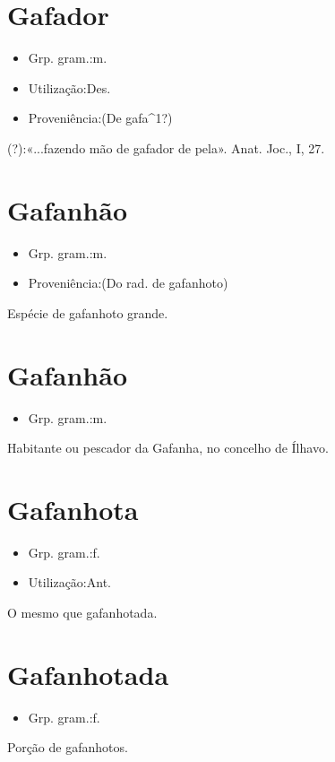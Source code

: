 \section{Gafador}
\begin{itemize}
\item {Grp. gram.:m.}
\end{itemize}
\begin{itemize}
\item {Utilização:Des.}
\end{itemize}
\begin{itemize}
\item {Proveniência:(De \textunderscore gafa\textunderscore ^1?)}
\end{itemize}
(?):«\textunderscore ...fazendo mão de gafador de pela\textunderscore ». \textunderscore Anat. Joc.\textunderscore , I, 27.
\section{Gafanhão}
\begin{itemize}
\item {Grp. gram.:m.}
\end{itemize}
\begin{itemize}
\item {Proveniência:(Do rad. de \textunderscore gafanhoto\textunderscore )}
\end{itemize}
Espécie de gafanhoto grande.
\section{Gafanhão}
\begin{itemize}
\item {Grp. gram.:m.}
\end{itemize}
Habitante ou pescador da Gafanha, no concelho de Ílhavo.
\section{Gafanhota}
\begin{itemize}
\item {Grp. gram.:f.}
\end{itemize}
\begin{itemize}
\item {Utilização:Ant.}
\end{itemize}
O mesmo que \textunderscore gafanhotada\textunderscore .
\section{Gafanhotada}
\begin{itemize}
\item {Grp. gram.:f.}
\end{itemize}
Porção de gafanhotos.
